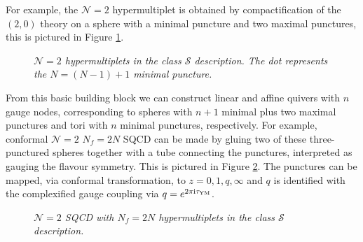 \documentclass[main.tex]{subfiles}
\begin{document}
For example, the $\mathcal{N}=2$ hypermultiplet is obtained by compactification of the $(2,0)$ theory on a sphere with a minimal puncture and two maximal punctures, this is pictured in Figure \ref{fig:n2hypersclassS}.
\begin{figure}
\centering
{}
\caption{\textit{$\mathcal{N}=2$ hypermultiplets in the class $\mathcal{S}$ description.  The dot represents the $N=(N-1)+1$ minimal puncture.}}
\label{fig:n2hypersclassS}
\end{figure}
From this basic building block we can construct linear and affine quivers with $n$ gauge nodes, corresponding to spheres with $n+1$ minimal plus two maximal punctures and tori with $n$ minimal punctures, respectively.
For example, conformal $\mathcal{N}=2$ $N_f=2N$ SQCD can be made by gluing two of these three-punctured spheres together with a tube connecting the punctures, interpreted as gauging the flavour symmetry.  This is pictured in Figure \ref{fig:n2SCQCDsclassS}.  The punctures can be mapped, via conformal transformation, to $z=0,1,q,\infty$ and $q$ is identified with the complexified gauge coupling via $q=e^{2\pi\mathrm{i}\tau_{\text{YM}}}$.
\begin{figure}
\centering
{}
\caption{\textit{$\mathcal{N}=2$ SQCD with $N_f=2N$ hypermultiplets in the class $\mathcal{S}$ description.}}
\label{fig:n2SCQCDsclassS}
\end{figure}
 
\end{document}
